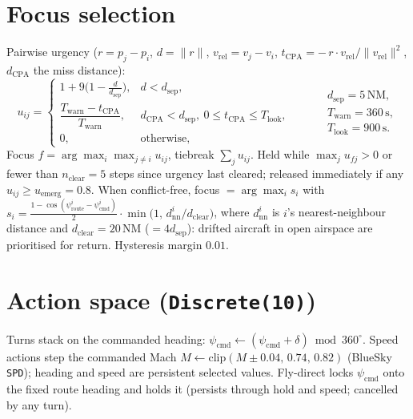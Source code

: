\documentclass[11pt, a4paper]{article}
\begin{document}
\section{Focus selection}
Pairwise urgency ($r=p_j-p_i$, $d=\lVert r\rVert$, $v_\text{rel}=v_j-v_i$,
$t_\text{CPA}=-\,r\!\cdot\! v_\text{rel}/\lVert v_\text{rel}\rVert^2$, $d_\text{CPA}$ the miss distance):
\[
u_{ij}=
\begin{cases}
1+9\bigl(1-\tfrac{d}{d_\text{sep}}\bigr), & d<d_\text{sep},\\[1mm]
\dfrac{T_\text{warn}-t_\text{CPA}}{T_\text{warn}}, & d_\text{CPA}<d_\text{sep},\ 0\le t_\text{CPA}\le T_\text{look},\\[1mm]
0, & \text{otherwise,}
\end{cases}
\qquad
\begin{aligned}
&d_\text{sep}=5\,\text{NM},\\
&T_\text{warn}=360\,\text{s},\\
&T_\text{look}=900\,\text{s}.
\end{aligned}
\]
Focus $f=\arg\max_i\max_{j\ne i}u_{ij}$, tiebreak $\sum_{j}u_{ij}$. Held while
$\max_j u_{fj}>0$ or fewer than $n_\text{clear}=5$ steps since urgency last cleared;
released immediately if any $u_{ij}\ge u_\text{emerg}=0.8$.
When conflict-free, focus $=\arg\max_i s_i$ with
$s_i=\tfrac{1-\cos(\psi^i_\text{route}-\psi^i_\text{cmd})}{2}\cdot\min\!\bigl(1,\,d^i_\text{nn}/d_\text{clear}\bigr)$,
where $d^i_\text{nn}$ is $i$'s nearest-neighbour distance and $d_\text{clear}=20$\,NM ($=4d_\text{sep}$):
drifted aircraft in open airspace are prioritised for return. Hysteresis margin $0.01$.

\section{Action space (\texttt{Discrete(10)})}
Turns stack on the commanded heading: $\psi_\text{cmd}\leftarrow(\psi_\text{cmd}+\delta)\bmod360^\circ$.
Speed actions step the commanded Mach $M\leftarrow\mathrm{clip}(M\pm0.04,\,0.74,\,0.82)$ (BlueSky \texttt{SPD});
heading and speed are persistent selected values. Fly-direct locks $\psi_\text{cmd}$ onto the fixed
route heading and holds it (persists through hold and speed; cancelled by any turn).
\end{document}
